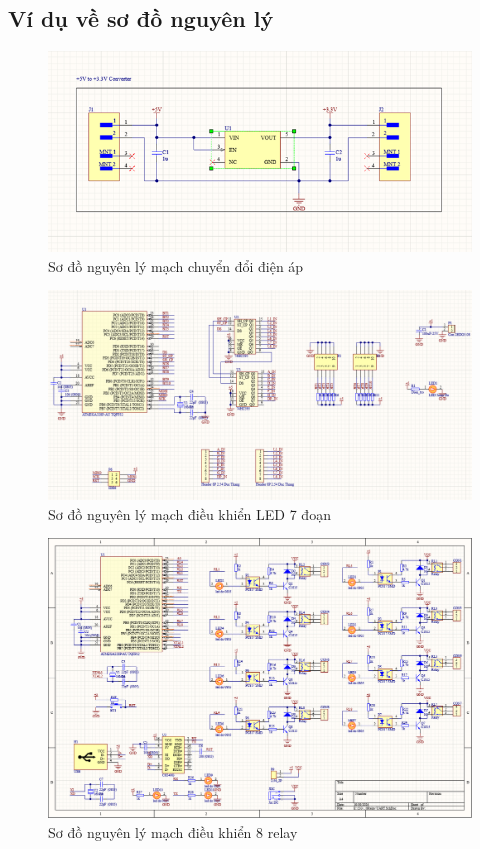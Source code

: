         \subsection{Ví dụ về sơ đồ nguyên lý}
            \begin{figure}[H]
                \centering
                \includegraphics[width=1\textwidth]{pictures/sch1.png}
                \caption{Sơ đồ nguyên lý mạch chuyển đổi điện áp}
                \label{fig:sodonguyenly}
            \end{figure}
            \begin{figure}[H]
                \centering
                \includegraphics[width=1\textwidth]{pictures/sch2.png}
                \caption{Sơ đồ nguyên lý mạch điều khiển LED 7 đoạn}
                \label{fig:sodonguyenly}
            \end{figure}
            \begin{figure}[H]
                \centering
                \includegraphics[width=1\textwidth]{pictures/sch3.png}
                \caption{Sơ đồ nguyên lý mạch điều khiển 8 relay}
                \label{fig:sodonguyenly}
            \end{figure}
